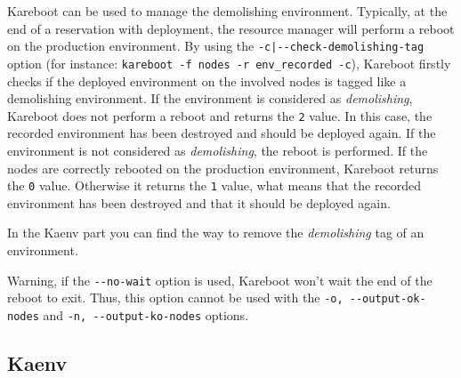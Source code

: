 \documentclass[a4wide,10pt,oneside]{book}
\begin{document}
Kareboot can be used to manage the demolishing environment. Typically, at the end of a reservation with deployment, the resource manager will perform a reboot on the production environment. By using the \texttt{-c|-{}-check-demolishing-tag} option (for instance: \texttt{kareboot -f nodes -r env\_recorded -c}), Kareboot firstly checks if the deployed environment on the involved nodes is tagged like a demolishing environment. If the environment is considered as \textit{demolishing}, Kareboot does not perform a reboot and returns the \texttt{2} value. In this case, the recorded environment has been destroyed and should be deployed again. If the environment is not considered as \textit{demolishing}, the reboot is performed. If the nodes are correctly rebooted on the production environment, Kareboot returns the \texttt{0} value. Otherwise it returns the \texttt{1} value, what means that the recorded environment has been destroyed and that it should be deployed again.

In the Kaenv part you can find the way to remove the \textit{demolishing} tag of an environment.

Warning, if the \texttt{-{}-no-wait} option is used, Kareboot won't wait the end of the reboot to exit. Thus, this option cannot be used with the \texttt{-o, -{}-output-ok-nodes} and \texttt{-n, -{}-output-ko-nodes} options.


\subsection{Kaenv}\label{sec:kaenv}
\end{document}
